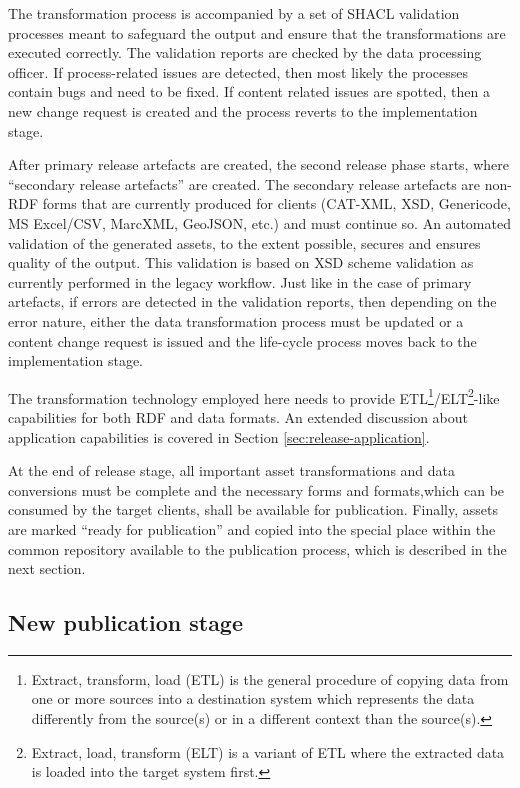 	The transformation process is accompanied by a set of SHACL validation processes meant to safeguard the output and ensure that the transformations are executed correctly. The validation reports are checked by the data processing officer. If process-related issues are detected, then most likely the processes contain bugs and need to be fixed. If content related issues are spotted, then a new change request is created and the process reverts to the implementation stage. 
	
	After primary release artefacts are created, the second release phase starts, where ``secondary release artefacts'' are created. The secondary release artefacts are non-RDF forms that are currently produced for clients (CAT-XML, XSD, Genericode, MS Excel/CSV, MarcXML, GeoJSON, etc.) and must continue so. An automated validation of the generated assets, to the extent possible, secures and ensures quality of the output. This validation is based on XSD scheme validation as currently performed in the legacy workflow. Just like in the case of primary artefacts, if errors are detected in the validation reports, then depending on the error nature, either the data transformation process must be updated or a content change request is issued and the life-cycle process moves back to the implementation stage.
	
	The transformation technology employed here needs to provide ETL\footnote{Extract, transform, load (ETL) is the general procedure of copying data from one or more sources into a destination system which represents the data differently from the source(s) or in a different context than the source(s).}/ELT\footnote{Extract, load, transform (ELT) is a variant of ETL where the extracted data is loaded into the target system first.}-like capabilities for both RDF and data formats. An extended discussion about application capabilities is covered in Section \ref{sec:release-application}.
	\enlargethispage{1em}
	
	At the end of release stage, all important asset transformations and data conversions must be complete and the necessary forms and formats,which can be consumed by the target clients, shall be available for publication. Finally, assets are marked ``ready for publication'' and copied into the special place within the common repository available to the publication process, which is described in the next section. 
	
	\subsection{New publication stage}
	\label{sec:publication-new}
	
